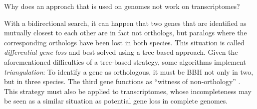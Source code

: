Why does an approach that is used on genomes not work on transcriptomes?

With a bidirectional search, it can happen that two genes that are identified as
mutually closest to each other are in fact not orthologs, but paralogs where the
corresponding orthologs have been lost in both species. This situation is called
\emph{differential gene loss} and best solved using a tree-based approach. Given
the aforementioned difficulties of a tree-based strategy, some algorithms
implement \emph{triangulation}: To identify a gene as orthologous, it must be
BBH not only in two, but in three species. The third gene functions as ``witness
of non-orthology'' \citep{dessimoz2006}. This strategy must also be applied to
transcriptomes, whose incompleteness may be seen as a similar situation as
potential gene loss in complete genomes.
